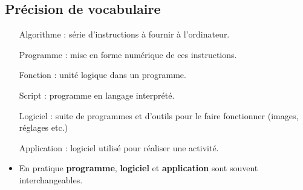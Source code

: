 \subsection{Précision de vocabulaire}
\begin{slide}
	\small
	\begin{itemize}
		\item[Algorithme] : série d'instructions à fournir à l'ordinateur.
		\item[Programme] : mise en forme numérique de ces instructions. %
		\item[Fonction] : unité logique dans un programme. %
		\item[Script] : programme en langage interprété. %
		\item[Logiciel] : suite de programmes et d'outils pour le faire fonctionner (images, réglages etc.)
		\item[Application] : logiciel utilisé pour réaliser une activité. %
		\item En pratique \textbf{programme}, \textbf{logiciel} et \textbf{application} sont souvent interchangeables.
	\end{itemize}


\end{slide}
